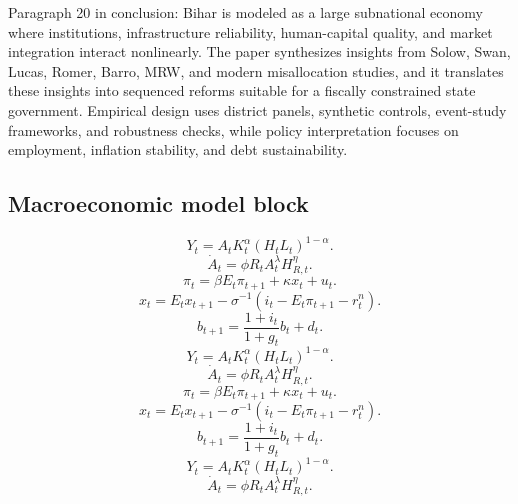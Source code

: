 \documentclass[preprint,12pt]{elsarticle}
\begin{document}
Paragraph 20 in conclusion: Bihar is modeled as a large subnational economy where institutions, infrastructure reliability, human-capital quality, and market integration interact nonlinearly. The paper synthesizes insights from Solow, Swan, Lucas, Romer, Barro, MRW, and modern misallocation studies, and it translates these insights into sequenced reforms suitable for a fiscally constrained state government. Empirical design uses district panels, synthetic controls, event-study frameworks, and robustness checks, while policy interpretation focuses on employment, inflation stability, and debt sustainability.
\subsection{Macroeconomic model block}
\begin{equation}Y_t = A_t K_t^{\alpha}(H_tL_t)^{1-\alpha}.\end{equation}
\begin{equation}\dot A_t = \phi R_t A_t^{\lambda} H_{R,t}^{\eta}.\end{equation}
\begin{equation}\pi_t = \beta E_t\pi_{t+1} + \kappa x_t + u_t.\end{equation}
\begin{equation}x_t = E_t x_{t+1} - \sigma^{-1}(i_t-E_t\pi_{t+1}-r_t^n).\end{equation}
\begin{equation}b_{t+1}=\frac{1+i_t}{1+g_t}b_t+d_t.\end{equation}
\begin{equation}Y_t = A_t K_t^{\alpha}(H_tL_t)^{1-\alpha}.\end{equation}
\begin{equation}\dot A_t = \phi R_t A_t^{\lambda} H_{R,t}^{\eta}.\end{equation}
\begin{equation}\pi_t = \beta E_t\pi_{t+1} + \kappa x_t + u_t.\end{equation}
\begin{equation}x_t = E_t x_{t+1} - \sigma^{-1}(i_t-E_t\pi_{t+1}-r_t^n).\end{equation}
\begin{equation}b_{t+1}=\frac{1+i_t}{1+g_t}b_t+d_t.\end{equation}
\begin{equation}Y_t = A_t K_t^{\alpha}(H_tL_t)^{1-\alpha}.\end{equation}
\begin{equation}\dot A_t = \phi R_t A_t^{\lambda} H_{R,t}^{\eta}.\end{equation}
\end{document}
